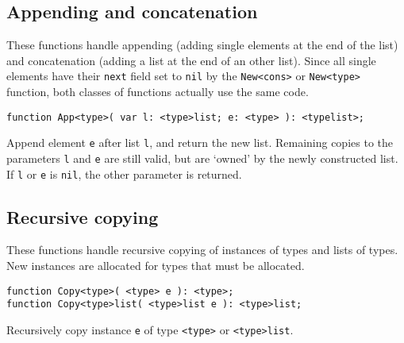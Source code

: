 \documentclass{article}
\newenvironment{desc}{\nopagebreak\vspace{-\bigskipamount}\vspace{-\parskip}\begin{list}{}{\setlength{\topsep}{0pt}\setlength{\rightmargin}{0pt}}\item[]}{\end{list}}
\begin{document}
\subsection{Appending and concatenation}
These functions handle appending (adding single elements at the end of the list)
and concatenation (adding a list at the end of an other list).
Since all single elements have their {\tt next} field set to {\tt nil}
by the {\tt New<cons>} or {\tt New<type>} function,
both classes of functions actually use the same code.
\begin{verbatim}
function App<type>( var l: <type>list; e: <type> ): <typelist>;
\end{verbatim}
\begin{desc}
Append element {\tt e} after list {\tt l},
and return the new list.
Remaining copies to the parameters {\tt l} and {\tt e} are still valid,
but are `owned' by the newly constructed list.
If {\tt l} or {\tt e} is {\tt nil}, the other parameter is returned.
\end{desc}
\subsection{Recursive copying}
These functions handle recursive copying of instances of types
and lists of types.
New instances are allocated for types that must be allocated.
\begin{verbatim}
function Copy<type>( <type> e ): <type>;
function Copy<type>list( <type>list e ): <type>list;
\end{verbatim}
\begin{desc}
Recursively copy instance {\tt e} of type {\tt <type>} or
{\tt <type>list}.
\end{desc}
\end{document}
